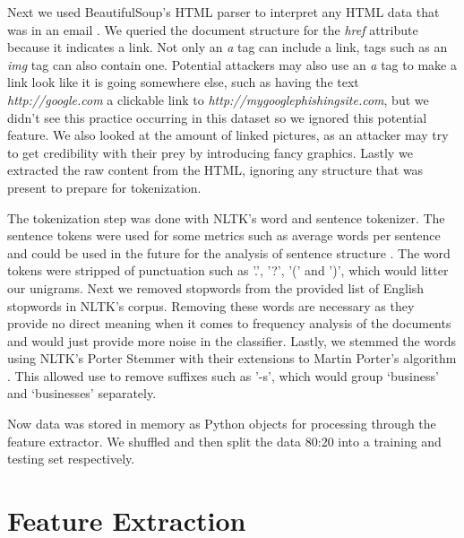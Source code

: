 \documentclass[12pt]{article}
\begin{document}
\begin{multicols}{2}
            Next we used BeautifulSoup's HTML parser to interpret any HTML data that
            was in an email \cite{beautiful_soup}. We queried the document structure for the \textit{href}
            attribute because it indicates a link. Not only an \textit{a} tag can include
            a link, tags such as an \textit{img} tag can also contain one. Potential attackers
            may also use an \textit{a} tag to make a link look like it is going somewhere else,
            such as having the text \textit{http://google.com} a clickable link to
            \textit{http://mygooglephishingsite.com}, but we didn't see this practice 
            occurring in this dataset so we ignored this potential feature. We also looked at the
            amount of linked pictures, as an attacker may try to get credibility with their prey
            by introducing fancy graphics. Lastly we extracted the raw content from the HTML,
            ignoring any structure that was present to prepare for tokenization.


            The tokenization step was done with NLTK's word and sentence tokenizer.
            The sentence tokens were used for some metrics such as average words per
            sentence and could be used in the future for the analysis of sentence
            structure \cite{nltk}. The word tokens were stripped of punctuation such as '.',
            '?', '(' and ')', which would litter our unigrams. Next we removed stopwords
            from the provided list of English stopwords in NLTK's corpus. Removing
            these words are necessary as they provide no direct meaning when it comes
            to frequency analysis of the documents and would just provide more noise
            in the classifier. Lastly, we
            stemmed the words using NLTK's Porter Stemmer with their extensions to
            Martin Porter's algorithm \cite{porter1980algorithm}. This allowed use to remove suffixes such as '-s',
            which would group `business' and `businesses' separately.


            Now data was stored in memory as Python objects for processing through the
            feature extractor. We shuffled and then split the data 
            80:20 into a training and testing set respectively.
        
        \section{Feature Extraction}


\end{multicols}
\end{document}
